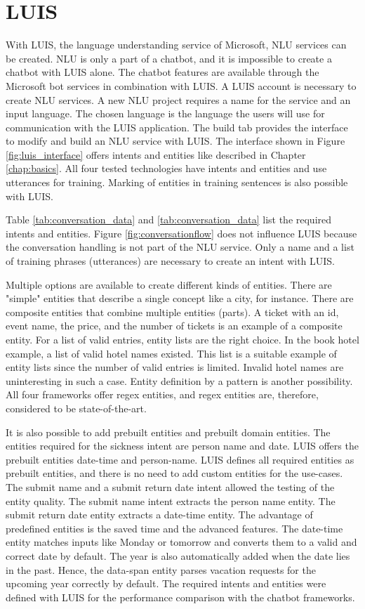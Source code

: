 \section{LUIS}
With LUIS\cite{luisdocs}, the language understanding service of Microsoft, NLU services can be created.
NLU is only a part of a chatbot, and it is impossible to create a chatbot with LUIS alone.
The chatbot features are available through the Microsoft bot services 
in combination with LUIS.
A LUIS account is necessary to create NLU services.
A new NLU project requires a name for the service and an input language.
The chosen language is the language the users will use for communication with the LUIS application.
The build tab provides the interface to modify and build an NLU service with LUIS.
The interface shown in Figure \ref{fig:luis_interface} offers intents and entities like described in Chapter \ref{chap:basics}.
All four tested technologies have intents and entities and use utterances for training.
Marking of entities in training sentences is also possible with LUIS.

Table \ref{tab:conversation_data} and \ref{tab:conversation_data} list the required intents and entities.
Figure \ref{fig:conversationflow} does not influence LUIS because the 
conversation handling is not part of the NLU service.
Only a name and a list of training phrases (utterances) are necessary to create an intent with LUIS.

Multiple options are available to create different kinds of entities.
There are "simple" entities that describe a single concept like a city, for instance.
There are composite entities that combine multiple entities (parts).
A ticket with an id, event name, the price, and the number of tickets is an example of a composite entity.
For a list of valid entries, entity lists are the right choice.
In the book hotel example, a list of valid hotel names existed.
This list is a suitable example of entity lists since the number of valid entries is limited. 
Invalid hotel names are uninteresting in such a case.
Entity definition by a pattern is another possibility.
All four frameworks offer regex entities, and regex entities are, therefore, considered to be state-of-the-art.

It is also possible to add prebuilt entities and prebuilt domain entities.
The entities required for the sickness intent are person name and date. 
LUIS offers the prebuilt entities date-time and person-name.
LUIS defines all required entities as prebuilt entities, and there is no need to add custom entities for the use-cases.
The submit name and a submit return date intent allowed the testing of the entity quality.
The submit name intent extracts the person name entity.
The submit return date entity extracts a date-time entity.
The advantage of predefined entities is the saved time and the 
advanced features.
The date-time entity matches inputs like Monday or tomorrow and converts them to a valid and correct date by default.
The year is also automatically added when the date lies in the past.
Hence, the data-span entity parses vacation requests for the upcoming year correctly by default.
The required intents and entities were defined with LUIS for the performance comparison with the chatbot frameworks.
